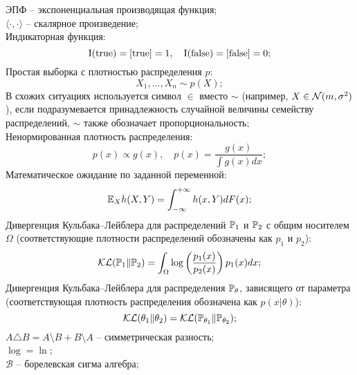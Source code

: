 ЭПФ -- экспоненциальная производящая функция;\\
$\langle \cdot, \cdot\rangle$ -- скалярное произведение; \\
Индикаторная функция:
\[
\mathrm{I}(\text{true}) = [\text{true}] = 1, \quad \mathrm{I}(\text{false}) = [\text{false}] = 0;
\]
Простая выборка с плотностью распределения $p$:
\[
X_1,\ldots,X_n \sim p(X);
\]
В схожих ситуациях используется символ $\in$ вместо $\sim$ (например, $X \in \mathcal{N}(m, \sigma^2)$), если подразумевается принадлежность случайной величины  семейству распределений, $\sim$ также обозначает пропорциональность; \\ 
Ненормированная плотность распределения:
\[
p(x) \propto g(x), \quad p(x) = \frac{g(x)}{\int g(x) dx};
\]
Математическое ожидание по заданной переменной:
\[
\mathrm{{\mathbb E}}_X h(X,Y) = \int_{-\infty}^{+\infty} h(x,Y) dF(x); 
\]
Дивергенция Кульбака--Лейблера для распределений $\mathrm{{\mathbb P}}_1$ и $\mathrm{{\mathbb P}}_2$ с общим носителем~$\Omega$ (соответствующие плотности распределений обозначены как $p_1$ и $p_2$):
\[
\mathcal{KL}(\mathrm{{\mathbb P}}_1 \Vert \mathrm{{\mathbb P}}_2) = \int_{\Omega} \log \left( \frac{p_1(x)}{p_2(x)} \right) p_1(x) dx;
\]
Дивергенция Кульбака--Лейблера для распределения $\mathrm{{\mathbb P}}_\theta$, зависящего от параметра (соответствующая плотность распределения обозначена как $p(x| \theta)$):
\[
\mathcal{KL}(\theta_1 \Vert \theta_2) = \mathcal{KL}(\mathrm{{\mathbb P}}_{\theta_1} \Vert \mathrm{{\mathbb P}}_{\theta_2});
\]
$A \triangle B = A \setminus B + B \setminus A$ -- симметрическая разность; \\
$\log = \ln$; \\
$\mathcal{B}$ -- борелевская сигма алгебра;




